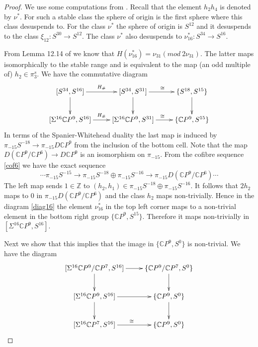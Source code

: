 \documentclass[a4paper,leqno,12pt]{amsart}
\theoremstyle{plain}
\theoremstyle{definition}
\numberwithin{equation}{section}
\begin{document}
\begin{proof}
We use some computations from \cite{Tod}. Recall that the element $h_2h_4$ is denoted by $\nu^\ast$. For such a stable class the sphere of origin is the first sphere where this class desuspends to. For the class $\nu^*$ the sphere of origin is $S^{12}$ and it desuspends to the class $\xi_{12} : S^{30}\to S^{12}$. The class $\nu^*$ also desuspends to $\nu^*_{16}: S^{34}\to S^{16}$. 

From Lemma 12.14 of \cite{Tod} we know that $H(\nu_{16}^*) = \nu_{31} (\mathit{mod}~2\nu_{31})$. The latter maps isomorphically to the stable range and is equivalent to the map (an odd multiple of) $h_2 \in \pi_3^s$. We have the commutative diagram 
\begin{equation}\label{diag16}
\xymatrix{ [S^{34}, S^{16}] \ar[r]^{H_\#} \ar[d]   & [S^{34}, S^{31}] \ar[d] \ar[r]^{\cong} & \{S^{18}, S^{15}\} \ar[d]  \\
[\Sigma^{16} {\mathbb{C}} P^9, S^{16}]\ar[r]^{H_\#}     & [\Sigma^{16} {\mathbb{C}} P^9 , S^{31}] \ar[r]^{\cong} & \{ {\mathbb{C}} P^9, S^{15}\} } 
\end{equation} 
In terms of the Spanier-Whitehead duality the last map is induced by $\pi_{-15}S^{-18} \to \pi_{-15} D{\mathbb{C}} P^9$ from the inclusion of the bottom cell. Note that the map $D({\mathbb{C}} P^9/{\mathbb{C}} P^6) \to D{\mathbb{C}} P^9$ is an isomorphism on $\pi_{-15}$. From the cofibre sequence \ref{cof6} we have the exact sequence 
$$ \cdots \pi_{-15}S^{-15} \to \pi_{-15} S^{-18} \oplus \pi_{-15}S^{-16} \to \pi_{-15} D({\mathbb{C}} P^9/{\mathbb{C}} P^6)\cdots $$
The left map sends $1\in {\mathbb{Z}}$ to $(h_2,h_1) \in \pi_{-15} S^{-18} \oplus \pi_{-15}S^{-16}$. It follows that $2h_2$ maps to $0$ in $\pi_{-15} D({\mathbb{C}} P^9/{\mathbb{C}} P^6)$ and the class $h_2$ maps non-trivially. Hence in the diagram \ref{diag16} the element $\nu_{16}^*$ in the top left corner maps to a non-trivial element in the bottom right group $\{ {\mathbb{C}} P^9, S^{15}\}$. Therefore it maps non-trivially in $[\Sigma^{16} {\mathbb{C}} P^9, S^{16}]$. 

Next we show that this implies that the image in $\{ {\mathbb{C}} P^9, S^0\}$ is non-trivial. We have the diagram 
$$\xymatrix{
[\Sigma^{16} {\mathbb{C}} P^9/ {\mathbb{C}} P^7, S^{16}]  \ar[r] \ar[d]     &   \{ {\mathbb{C}} P^9/{\mathbb{C}} P^7, S^0\} \ar[d] \\
[\Sigma^{16} {\mathbb{C}} P^9, S^{16}]               \ar[r] \ar[d]     &    \{ {\mathbb{C}} P^9, S^0\}   \ar[d]         \\
[\Sigma^{16} {\mathbb{C}} P^7, S^{16}]            \ar[r]^{\cong}   &   \{ {\mathbb{C}} P^9, S^0\}         }$$


\end{proof}
\end{document}
